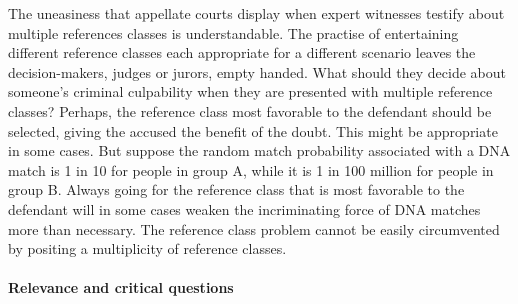 \documentclass{article}
\begin{document}
The uneasiness that
appellate courts display when expert witnesses testify about multiple references classes is understandable. 
The practise of entertaining different reference classes each appropriate for a different scenario  leaves the decision-makers, judges or jurors, empty handed. What should they decide about someone's criminal culpability when they are presented with multiple reference classes? Perhaps, the reference class most favorable to the defendant should be selected, giving the accused the benefit of the doubt. This might be appropriate in some cases. But suppose the random match probability associated with a DNA match is 1 in 10 for people in group A, while it is 1 in 100 million for people in group B. Always going for the reference class that is most favorable to the defendant will in some cases weaken the incriminating force of DNA matches more than necessary. 
%
The reference class problem cannot be easily circumvented by positing a multiplicity of reference classes.


\paragraph{Relevance and critical questions}
\end{document}
